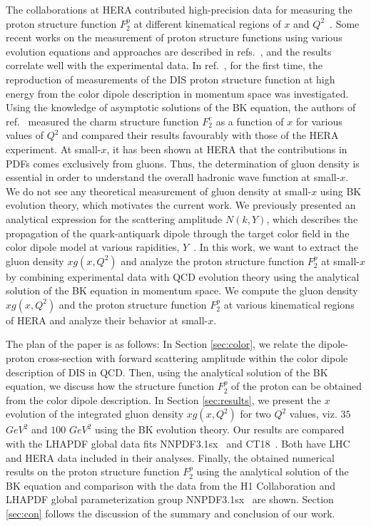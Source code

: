 \documentclass[12pt]{article}
\begin{document}
The collaborations at HERA contributed high-precision data for measuring the proton structure function $F_2 ^p$ at different kinematical regions of $x$ and $Q^2$~\cite{w,x}. Some recent works on the measurement of proton structure functions using various evolution equations and approaches are described in refs.~\cite{y,y1,z,aa,ab}, and the results correlate well with the experimental data. In ref.~\cite{ac}, for the first time, the reproduction of measurements of the DIS proton structure function at high energy from the color dipole description in momentum space was investigated. Using the knowledge of asymptotic solutions of the BK equation, the authors of ref.~\cite{ac} measured the charm structure function $F_2 ^c$ as a function of $x$ for various values of $Q^2$ and compared their results favourably with those of the HERA experiment. At small-$x$, it has been shown at HERA that the contributions in PDFs comes exclusively from gluons. Thus, the determination of gluon density is essential in order to understand the overall hadronic wave function at small-$x$. We do not see any theoretical measurement of gluon density at small-$x$ using BK evolution theory, which motivates the current work. We previously presented an analytical expression for the scattering amplitude $N(k, Y)$, which describes the propagation of the quark-antiquark dipole through the target color field in the color dipole model at various rapidities, $Y$~\cite{v}. In this work, we want to extract the gluon density $xg(x,Q^2)$ and analyze the proton structure function $F_2 ^p$ at small-$x$ by combining experimental data with QCD evolution theory using the analytical solution of the BK equation in momentum space. We compute the gluon density $xg(x,Q^2)$ and the proton structure function $F_2 ^p$ at various kinematical regions of HERA and analyze their behavior at small-$x$. 

The plan of the paper is as follows: In Section \ref{sec:color}, we relate the dipole-proton cross-section with forward scattering amplitude within the color dipole description of DIS in QCD. Then, using the analytical solution of the BK equation, we discuss how the structure function $F_2 ^p$ of the proton can be obtained from the color dipole description. In Section \ref{sec:results}, we present the $x$ evolution of the integrated gluon density $xg(x,Q^2)$ for two $Q^2$ values, viz. $35$ $GeV^2$ and $100$ $GeV^2$ using the BK evolution theory. Our results are compared with the LHAPDF global data fits NNPDF3.1sx~\cite{15} and CT18~\cite{16}. Both have LHC and HERA data included in their analyses. Finally, the obtained numerical results on the proton structure function $F_2 ^p$ using the analytical solution of the BK equation and comparison with the data from the H1 Collaboration and LHAPDF global parameterization group NNPDF3.1sx~\cite{15} are shown. Section \ref{sec:con} follows the discussion of the summary and conclusion of our work.
\end{document}

